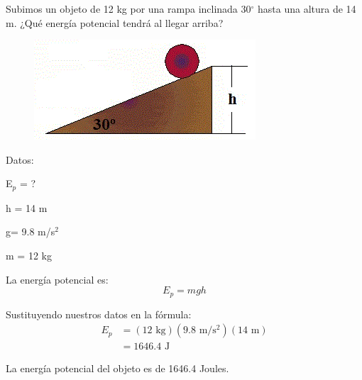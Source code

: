 Subimos un objeto de 12 kg por una rampa inclinada 30$^\circ$ hasta una altura de 14 m. ¿Qué energía potencial tendrá al llegar arriba?


\begin{minipage}{0.3\textwidth}
    \begin{figure}[H]
        \includegraphics[width=\linewidth]{../images/ejercicio-energia-potencial-rampa}
    \end{figure}
\end{minipage}\hfill
\begin{minipage}{0.65\textwidth}
    \begin{solutionbox}{5.3cm}
        \begin{multicols}{2}
            Datos:

            E$_p$ = ?

            h = 14 m

            g= 9.8 m/s$^2$

            m = 12 kg

            La energía potencial es:
            \[E_p=mgh\]

            \vspace{2cm}

            Sustituyendo nuestros datos en la fórmula:
            \[
                \begin{array}{rl}
                    E_p & = (12 \text{ kg})(9.8 \text{ m/s$^2$})(14 \text{ m}) \\[1em]
                        & =1646.4 \text{ J }
                \end{array}
            \]

        \end{multicols}
        \begin{center}La energía potencial del objeto es de 1646.4 Joules.\end{center}
    \end{solutionbox}
\end{minipage}